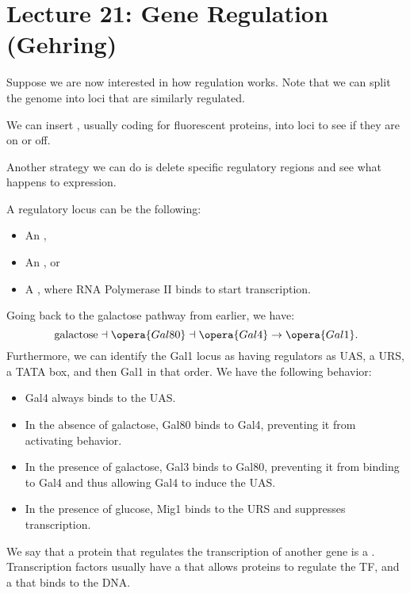 \section*{Lecture 21: Gene Regulation (Gehring)}
\setcounter{section}{21}

Suppose we are now interested in how regulation works. Note that we can split the genome into loci that are similarly regulated.

\begin{defn}
	We can insert , usually coding for fluorescent proteins, into loci to see if they are on or off.
\end{defn}

Another strategy we can do is delete specific regulatory regions and see what happens to expression.

\begin{defn}
	A regulatory locus can be the following:
	\begin{itemize}
		\item An ,
		\item An , or
		\item A , where RNA Polymerase II binds to start transcription.
	\end{itemize}
\end{defn}

Going back to the galactose pathway from earlier, we have: \[
	\text{galactose} \dashv \opera{Gal80} \dashv \opera{Gal4} \to \opera{Gal1}.
\]
Furthermore, we can identify the Gal1 locus as having regulators as UAS, a URS, a TATA box, and then Gal1 in that order.
We have the following behavior:
\begin{itemize}
	\item Gal4 always binds to the UAS.
	\item In the absence of galactose, Gal80 binds to Gal4, preventing it from activating behavior.
	\item In the presence of galactose, Gal3 binds to Gal80, preventing it from binding to Gal4 and thus allowing Gal4 to induce the UAS.
	\item In the presence of glucose, Mig1 binds to the URS and suppresses transcription.
\end{itemize}

\begin{defn}
	We say that a protein that regulates the transcription of another gene is a . 
	Transcription factors usually have a  that allows proteins to regulate the TF, and a  that binds to the DNA.
\end{defn}

